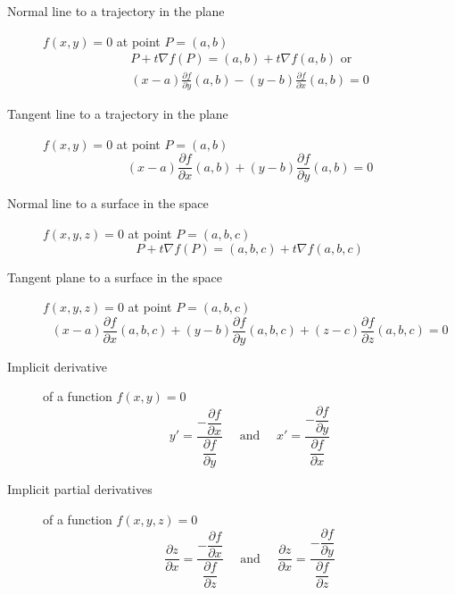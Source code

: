 \begin{multicols}{2}
	\begin{tcolorbox}[hbox, title=Tangent and normal lines in the plane]
		\begin{minipage}{0.4\textwidth}
			\flushleft
			\begin{description}
				\item[Normal line to a trajectory in the plane] $f(x,y)=0$ at point $P=(a,b)$
				\[
					\begin{array}{c}
						P+t\nabla f(P) = (a,b)+t\nabla f(a,b) \mbox{ or } \\
						(x-a)\frac{\partial f}{\partial y}(a,b)-(y-b)\frac{\partial f}{\partial x}(a,b)=0
					\end{array}      
				\]
				\item[Tangent line to a trajectory in the plane] $f(x,y)=0$ at point $P=(a,b)$
				\[
					(x-a)\frac{\partial f}{\partial x}(a,b)+(y-b)\frac{\partial f}{\partial y}(a,b)=0
				\]
			\end{description}
		\end{minipage}
  \end{tcolorbox}
  
  \begin{tcolorbox}[hbox, title=Normal line and tangent plane in the space]
		\begin{minipage}{0.4\textwidth}
			\flushleft
			\begin{description}
				\item[Normal line to a surface in the space] $f(x,y,z)=0$ at point $P=(a,b,c)$
			  \[
				  P+t\nabla f(P) = (a,b,c)+t\nabla f(a,b,c)
				\]
				\item[Tangent plane to a surface in the space] $f(x,y,z)=0$ at point $P=(a,b,c)$
				\[
					(x-a)\frac{\partial f}{\partial x}(a,b,c)+(y-b)\frac{\partial f}{\partial y}(a,b,c)+(z-c)\frac{\partial f}{\partial z}(a,b,c)=0
				\]
			\end{description}
		\end{minipage}
	\end{tcolorbox}

	\begin{tcolorbox}[hbox, title=Implicit derivatives]
		\begin{minipage}{0.4\textwidth}
			\flushleft
			\begin{description}
				\item[Implicit derivative] of a function $f(x,y)=0$
				\[
					y' = \frac{-\dfrac{\partial f}{\partial x}}{\dfrac{\partial f}{\partial y}}
					\quad \mbox{ and } \quad
					x' = \frac{-\dfrac{\partial f}{\partial y}}{\dfrac{\partial f}{\partial x}}
				\]
				\item[Implicit partial derivatives] of a function $f(x,y,z)=0$
				\[
					\frac{\partial z}{\partial x} = \frac{-\dfrac{\partial f}{\partial x}}{\dfrac{\partial f}{\partial z}}
					\quad \mbox{ and } \quad
					\frac{\partial z}{\partial x} = \frac{-\dfrac{\partial f}{\partial y}}{\dfrac{\partial f}{\partial z}}
				\]
			\end{description}
		\end{minipage}
	\end{tcolorbox}


\end{multicols}
